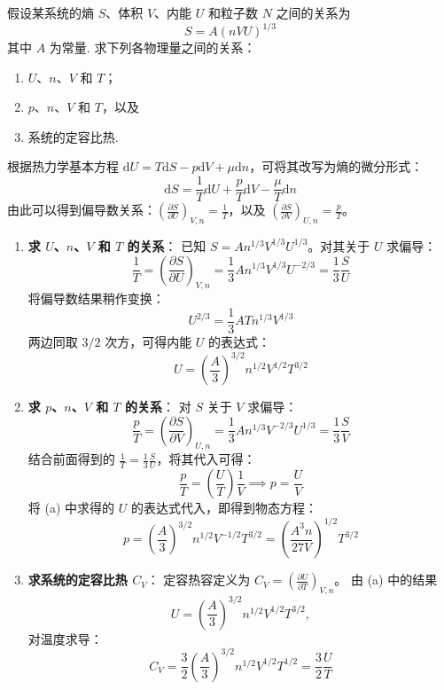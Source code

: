 \begin{exercise}\label{ex:12.2}
假设某系统的熵 $S$、体积 $V$、内能 $U$ 和粒子数 $N$ 之间的关系为
$$ S = A(nVU)^{1/3} $$
其中 $A$ 为常量. 求下列各物理量之间的关系：
\begin{enumerate}
  \item[(a)] $U$、$n$、$V$ 和 $T$；
  \item[(b)] $p$、$n$、$V$ 和 $T$，以及
  \item[(c)] 系统的定容比热.
\end{enumerate}
\end{exercise}
\begin{solution}
根据热力学基本方程 $\mathrm{d}U = T\mathrm{d}S - p\mathrm{d}V + \mu\mathrm{d}n$，可将其改写为熵的微分形式：
$$ \mathrm{d}S = \frac{1}{T}\mathrm{d}U + \frac{p}{T}\mathrm{d}V - \frac{\mu}{T}\mathrm{d}n $$
由此可以得到偏导数关系：$\left(\frac{\partial S}{\partial U}\right)_{V,n} = \frac{1}{T}$，以及 $\left(\frac{\partial S}{\partial V}\right)_{U,n} = \frac{p}{T}$。

\begin{enumerate}
    \item[(a)] \textbf{求 $U$、$n$、$V$ 和 $T$ 的关系}：
    已知 $S = A n^{1/3} V^{1/3} U^{1/3}$。对其关于 $U$ 求偏导：
    $$ \frac{1}{T} = \left(\frac{\partial S}{\partial U}\right)_{V,n} = \frac{1}{3} A n^{1/3} V^{1/3} U^{-2/3} = \frac{1}{3} \frac{S}{U} $$
    将偏导数结果稍作变换：
    $$ U^{2/3} = \frac{1}{3} A T n^{1/3} V^{1/3} $$
    两边同取 $3/2$ 次方，可得内能 $U$ 的表达式：
    $$ U = \left( \frac{A}{3} \right)^{3/2} n^{1/2} V^{1/2} T^{3/2} $$

    \item[(b)] \textbf{求 $p$、$n$、$V$ 和 $T$ 的关系}：
    对 $S$ 关于 $V$ 求偏导：
    $$ \frac{p}{T} = \left(\frac{\partial S}{\partial V}\right)_{U,n} = \frac{1}{3} A n^{1/3} V^{-2/3} U^{1/3} = \frac{1}{3} \frac{S}{V} $$
    结合前面得到的 $\frac{1}{T} = \frac{1}{3} \frac{S}{U}$，将其代入可得：
    $$ \frac{p}{T} = \left( \frac{U}{T} \right) \frac{1}{V} \implies p = \frac{U}{V} $$
    将 (a) 中求得的 $U$ 的表达式代入，即得到物态方程：
    $$ p = \left( \frac{A}{3} \right)^{3/2} n^{1/2} V^{-1/2} T^{3/2} = \left( \frac{A^3 n}{27 V} \right)^{1/2} T^{3/2} $$

    \item[(c)] \textbf{求系统的定容比热 $C_V$}：
    定容热容定义为 $C_V = \left(\frac{\partial U}{\partial T}\right)_{V,n}$。
    由 (a) 中的结果
    \[
    U=\left(\frac A3\right)^{3/2}n^{1/2}V^{1/2}T^{3/2},
    \]
    对温度求导：
    $$ C_V = \frac{3}{2} \left( \frac{A}{3} \right)^{3/2} n^{1/2} V^{1/2} T^{1/2} = \frac{3}{2} \frac{U}{T} $$
\end{enumerate}
\end{solution}

